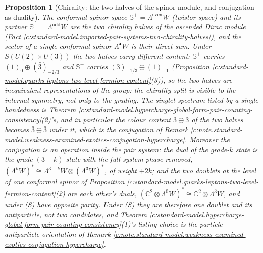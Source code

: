 \documentclass[11pt]{article}
\newtheorem{proposition}[theorem]{Proposition}
\theoremstyle{definition}
\theoremstyle{plain}
\newcommand{\changedmark}[2]{\marginpar{\raggedright\scriptsize\color{#1}#2}}
\providecommand{\C}{}\renewcommand{\C}{\mathbb{C}}
\providecommand{\CS}{}\renewcommand{\CS}{{\mathbb{S}^{+}}}
\providecommand{\CSm}{}\renewcommand{\CSm}{{\mathbb{S}^{-}}}
\begin{document}
\begin{proposition}[Chirality: the two halves of the spinor module, and conjugation as duality]\label{c:standard-model.chirality-two-halves-spinor-module-conjugation}
\changedmark{gray}{reworded}
The conformal spinor space $\CS = \Lambda^{\mathrm{even}}W$ (twistor space) and its partner $\CSm{} = \Lambda^{\mathrm{odd}}W$ are the two chirality halves of the ascended Dirac module (Fact \ref{c:standard-model.imported-pair-systems-two-chirality-halves}), and the sector of a single conformal spinor $\Lambda^{\bullet}W$ is their direct sum. Under $S(U(2) \times U(3))$ the two halves carry different content: $\CS$ carries $(1)_{0} \oplus (\bar{3})_{-2/3}$ and $\CSm{}$ carries $(3)_{-1/3} \oplus (1)_{-1}$ (Proposition \ref{c:standard-model.quarks-leptons-two-level-fermion-content}(3)), so the two halves are inequivalent representations of the group: the chirality split is visible to the internal symmetry, not only to the grading. The singlet spectrum listed by a single handedness is Theorem \ref{c:standard-model.hypercharge-global-form-pair-counting-consistency}(2)'s, and in particular the colour content $3 \oplus \bar{3}$ of the two halves becomes $\bar{3} \oplus \bar{3}$ under it, which is the conjugation of Remark \ref{c:note.standard-model.weakness-examined-exotics-conjugation-hypercharge}. Moreover the conjugation is an operation inside the pair system: the dual of the grade-$k$ state is the grade-$(3-k)$ state with the full-system phase removed, $(\Lambda^{k}W)^{*} \cong \Lambda^{3-k}W \otimes (\Lambda^{3}W)^{*}$, of weight $+2k$; and the two doublets at the level of one conformal spinor of Proposition \ref{c:standard-model.quarks-leptons-two-level-fermion-content}(2) are each other's duals, $(\C^{2} \otimes \Lambda^{0}W)^{*} \cong \C^{2} \otimes \Lambda^{3}W$, and under (S) have opposite parity. Under (S) they are therefore one doublet and its antiparticle, not two candidates, and Theorem \ref{c:standard-model.hypercharge-global-form-pair-counting-consistency}(1)'s listing choice is the particle-antiparticle orientation of Remark \ref{c:note.standard-model.weakness-examined-exotics-conjugation-hypercharge}.
\end{proposition}
\end{document}
